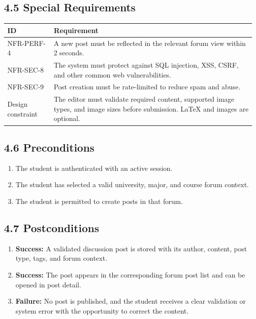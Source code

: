 \documentclass[12pt]{article}
\renewcommand{\baselinestretch}{1.5}
\begin{document}
\subsection*{4.5 Special Requirements}
\par\medskip
\begingroup
\small
\renewcommand{\baselinestretch}{1.0}\selectfont
\renewcommand{\arraystretch}{1.15}
\setlength{\tabcolsep}{6pt}
\begin{longtable}{|>{\raggedright\arraybackslash}p{}|>{\raggedright\arraybackslash}p{}|}
\hline
\textbf{ID} & \textbf{Requirement} \\ \hline
\endhead
NFR-PERF-4 & A new post must be reflected in the relevant forum view within 2 seconds. \\ \hline
NFR-SEC-8 & The system must protect against SQL injection, XSS, CSRF, and other common web vulnerabilities. \\ \hline
NFR-SEC-9 & Post creation must be rate-limited to reduce spam and abuse. \\ \hline
Design constraint & The editor must validate required content, supported image types, and image sizes before submission. LaTeX and images are optional. \\ \hline
\end{longtable}
\endgroup
\par\medskip
\hypertarget{sec:4-6-preconditions}{}
\subsection*{4.6 Preconditions}
\par\medskip
\begin{enumerate}
\item The student is authenticated with an active session.
\item The student has selected a valid university, major, and course forum context.
\item The student is permitted to create posts in that forum.
\end{enumerate}
\par\medskip
\hypertarget{sec:4-7-postconditions}{}
\subsection*{4.7 Postconditions}
\par\medskip
\begin{enumerate}
\item \textbf{Success:} A validated discussion post is stored with its author, content, post type, tags, and forum context.
\item \textbf{Success:} The post appears in the corresponding forum post list and can be opened in post detail.
\item \textbf{Failure:} No post is published, and the student receives a clear validation or system error with the opportunity to correct the content.
\end{enumerate}
\par\medskip
\hypertarget{sec:4-8-extension-points}{}
\end{document}
